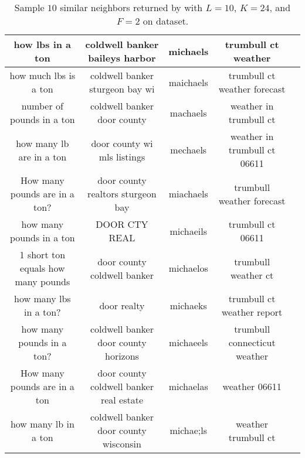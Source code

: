 \begin{table*}[t]
\centering
\footnotesize \addtolength{\tabcolsep}{-0.5pt} \addtolength{\tabcolsep}{-0.6pt}
{

\begin{tabular}{|c!{\vrule width 1.3pt}c!{\vrule width 1.3pt}c!{\vrule width 1.3pt}c!{\vrule width 1.3pt}c|}
\hline
\textbf{how lbs in a ton}&\textbf{coldwell banker baileys harbor }&\textbf{michaels} &\textbf{trumbull ct weather} \\ %
\hline
how much lbs is a ton & coldwell banker sturgeon bay wi & maichaels & trumbull ct weather forecast \\
number of pounds in a ton & coldwell banker door county & machaels & weather in trumbull ct  \\
how many lb are in a ton & door county wi mls listings & mechaels   & weather in trumbull ct 06611 \\
How many pounds are in a ton? & door county realtors sturgeon bay & miachaels & trumbull weather forecast \\
how many pounds in a ton & DOOR CTY REAL & michaeils & trumbull ct 06611 \\
1 short ton equals how many pounds & door county coldwell banker & michaelos & trumbull weather ct \\   
how many lbs in a ton? & door realty & michaeks & trumbull ct weather report \\
how many pounds in a ton? & coldwell banker door county horizons & michaeels & trumbull connecticut weather \\ 
How many pounds are in a ton & door county coldwell banker real estate & michaelas & weather 06611  \\
how many lb in a ton & coldwell banker door county wisconsin & michae;ls  & weather trumbull ct  \\
\hline
\end{tabular}
\caption{\footnotesize{Sample $10$ similar neighbors returned by \dflipb with $L=10$, $K=24$, and $F=2$ on \dataC dataset.}}
\label{tab:lists}
}
\end{table*}

